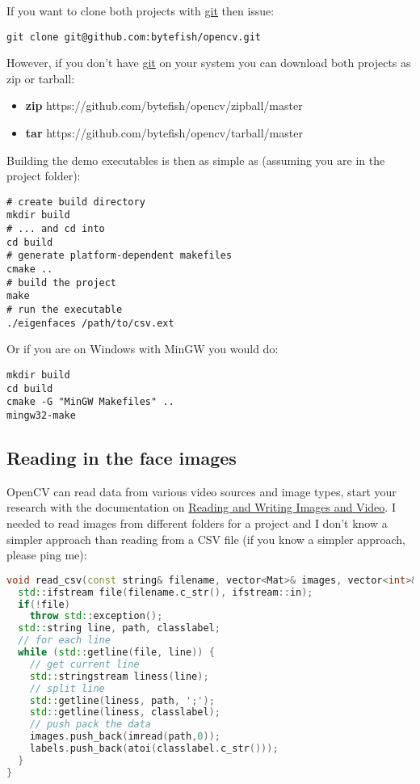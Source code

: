 If you want to clone both projects with \href{http://git-scm.com/}{git} then issue:

\begin{lstlisting}
git clone git@github.com:bytefish/opencv.git
\end{lstlisting}

However, if you don't have \href{http://git-scm.com/}{git} on your system you can download both projects as zip or tarball:

\begin{itemize}
	\item \textbf{zip} https://github.com/bytefish/opencv/zipball/master	
	\item \textbf{tar} https://github.com/bytefish/opencv/tarball/master
\end{itemize}

Building the demo executables is then as simple as (assuming you are in the project folder):
\begin{lstlisting}
# create build directory 
mkdir build
# ... and cd into
cd build
# generate platform-dependent makefiles
cmake ..
# build the project
make
# run the executable
./eigenfaces /path/to/csv.ext
\end{lstlisting}

Or if you are on Windows with MinGW you would do:
\begin{lstlisting}
mkdir build
cd build
cmake -G "MinGW Makefiles" ..
mingw32-make
\end{lstlisting}

\subsection{Reading in the face images}

\lstset{language=,}

OpenCV can read data from various video sources and image types, start your research with the documentation on \href{http://opencv.willowgarage.com/documentation/cpp/reading_and_writing_images_and_video.html}{Reading and Writing Images and Video}. I needed to read images from different folders for a project and I don't know a simpler approach than reading from a CSV file (if you know a simpler approach, please ping me):

\begin{lstlisting}[language=c++]
void read_csv(const string& filename, vector<Mat>& images, vector<int>& labels) {
  std::ifstream file(filename.c_str(), ifstream::in);
  if(!file)
    throw std::exception();
  std::string line, path, classlabel;
  // for each line
  while (std::getline(file, line)) {
    // get current line
    std::stringstream liness(line);
    // split line
    std::getline(liness, path, ';');
    std::getline(liness, classlabel);
    // push pack the data
    images.push_back(imread(path,0));
    labels.push_back(atoi(classlabel.c_str()));
  }
}
\end{lstlisting}

